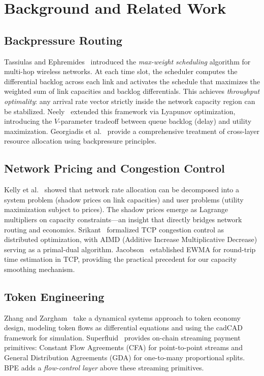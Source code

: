 \section{Background and Related Work}
\label{sec:background}

\subsection{Backpressure Routing}

Tassiulas and Ephremides~\cite{tassiulas1992stability} introduced the \emph{max-weight scheduling}
algorithm for multi-hop wireless networks. At each time slot, the scheduler computes the
differential backlog across each link and activates the schedule that maximizes the
weighted sum of link capacities and backlog differentials. This achieves \emph{throughput
optimality}: any arrival rate vector strictly inside the network capacity region can be
stabilized. Neely~\cite{neely2010stochastic} extended this framework via Lyapunov optimization,
introducing the $V$-parameter tradeoff between queue backlog (delay) and utility maximization.
Georgiadis et al.~\cite{georgiadis2006resource} provide a comprehensive treatment of
cross-layer resource allocation using backpressure principles.

\subsection{Network Pricing and Congestion Control}

Kelly et al.~\cite{kelly1998rate} showed that network rate allocation can be decomposed
into a system problem (shadow prices on link capacities) and user problems (utility
maximization subject to prices). The shadow prices emerge as Lagrange multipliers on
capacity constraints---an insight that directly bridges network routing and economics.
Srikant~\cite{srikant2004mathematics} formalized TCP congestion control as distributed
optimization, with AIMD (Additive Increase Multiplicative Decrease) serving as a
primal-dual algorithm. Jacobson~\cite{jacobson1988congestion} established EWMA for
round-trip time estimation in TCP, providing the practical precedent for our capacity
smoothing mechanism.

\subsection{Token Engineering}

Zhang and Zargham~\cite{zhang2020token} take a dynamical systems approach to token
economy design, modeling token flows as differential equations and using the cadCAD
framework for simulation. Superfluid~\cite{superfluid2024} provides on-chain streaming
payment primitives: Constant Flow Agreements (CFA) for point-to-point streams and
General Distribution Agreements (GDA) for one-to-many proportional splits. BPE adds
a \emph{flow-control layer} above these streaming primitives.

